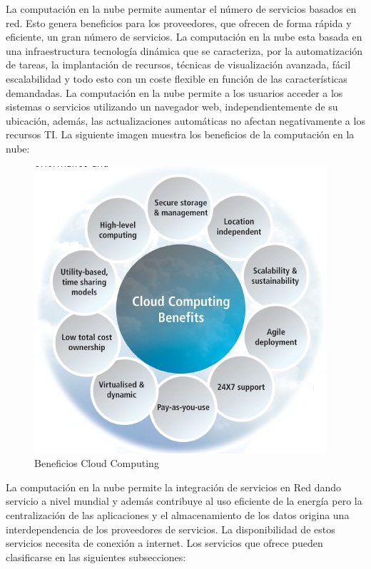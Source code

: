 \documentclass[a4paper,11pt]{book}
\begin{document}
La computación en la nube permite aumentar el número de servicios basados en red. Esto genera beneficios para los proveedores, que ofrecen de forma rápida y eficiente, un gran número de servicios. La computación en la nube esta basada en una infraestructura tecnología dinámica que se caracteriza, por la automatización de tareas, la implantación de recursos, técnicas de visualización avanzada, fácil escalabilidad y todo esto con un coste flexible en función de las características demandadas.  La computación en la nube permite a los usuarios acceder a los sistemas o servicios utilizando un navegador web, independientemente de su ubicación, además,  las actualizaciones automáticas no afectan negativamente a los recursos TI. La siguiente imagen muestra los beneficios de la computación en la nube:

\begin{figure}[H] 
\centering 
\includegraphics[scale=0.5]{imagenes/desarrollo_herramienta/beneficiosCC.jpg}
\caption{ Beneficios Cloud Computing\cite{beneficios} }
\end{figure}

La computación en la nube permite la integración de servicios en Red dando servicio a nivel mundial y además contribuye al uso eficiente de la energía pero la centralización de las aplicaciones y el almacenamiento de los datos origina una interdependencia de los proveedores de servicios. La disponibilidad de estos servicios necesita de conexión a internet. Los servicios que ofrece pueden clasificarse en las siguientes subsecciones: 
\end{document}
